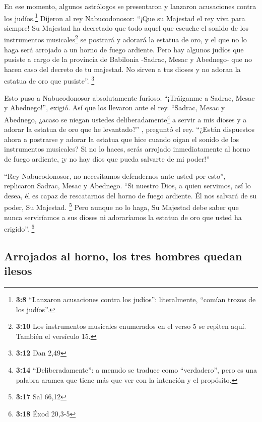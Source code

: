  En ese momento, algunos astrólogos se presentaron y
lanzaron acusaciones contra los judíos.\footnote{\textbf{3:8} ``Lanzaron
  acusaciones contra los judíos'': literalmente, ``comían trozos de los
  judíos''.}  Dijeron al rey Nabucodonosor: ``¡Que su
Majestad el rey viva para siempre!  Su Majestad ha
decretado que todo aquel que escuche el sonido de los instrumentos
musicales\footnote{\textbf{3:10} Los instrumentos musicales enumerados
  en el verso 5 se repiten aquí. También el versículo 15.} se postrará y
adorará la estatua de oro,  y el que no lo haga será
arrojado a un horno de fuego ardiente.  Pero hay algunos
judíos que pusiste a cargo de la provincia de Babilonia -Sadrac, Mesac y
Abednego- que no hacen caso del decreto de tu majestad. No sirven a tus
dioses y no adoran la estatua de oro que pusiste''. \footnote{\textbf{3:12}
  Dan 2,49}

 Esto puso a Nabucodonosor absolutamente furioso.
``¡Tráiganme a Sadrac, Mesac y Abednego!'', exigió. Así que los llevaron
ante el rey.  ``Sadrac, Mesac y Abednego, ¿acaso se
niegan ustedes deliberadamente\footnote{\textbf{3:14}
  ``Deliberadamente'': a menudo se traduce como ``verdadero'', pero es
  una palabra aramea que tiene más que ver con la intención y el
  propósito.} a servir a mis dioses y a adorar la estatua de oro que he
levantado?'' , preguntó el rey.  ``¿Están dispuestos
ahora a postrarse y adorar la estatua que hice cuando oigan el sonido de
los instrumentos musicales? Si no lo haces, serás arrojado
inmediatamente al horno de fuego ardiente, ¡y no hay dios que pueda
salvarte de mi poder!''

 ``Rey Nabucodonosor, no necesitamos defendernos ante
usted por esto'', replicaron Sadrac, Mesac y Abednego. 
``Si nuestro Dios, a quien servimos, así lo desea, él es capaz de
rescatarnos del horno de fuego ardiente. Él nos salvará de su poder, Su
Majestad. \footnote{\textbf{3:17} Sal 66,12}  Pero aunque
no lo haga, Su Majestad debe saber que nunca serviríamos a sus dioses ni
adoraríamos la estatua de oro que usted ha erigido''. \footnote{\textbf{3:18}
  Éxod 20,3-5}

\hypertarget{arrojados-al-horno-los-tres-hombres-quedan-ilesos}{%
\subsection{Arrojados al horno, los tres hombres quedan
ilesos}\label{arrojados-al-horno-los-tres-hombres-quedan-ilesos}}

